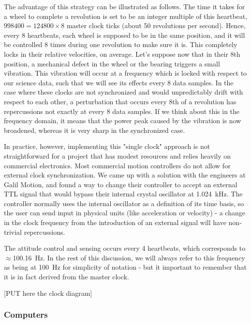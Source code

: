 The advantage of this strategy can be illustrated as follows. The time it takes for a wheel to complete a revolution is set to be an integer multiple of this heartbeat, $\num{998400}=\num{124800}\times 8$ master clock ticks (about 50 revolutions per second). Hence, every 8 heartbeats, each wheel is supposed to be in the same position, and it will be controlled 8 times during one revolution to make sure it is. This completely locks in their relative velocities, on average. Let's suppose now that in their 8th position, a mechanical defect in the wheel or the bearing triggers a small vibration. This vibration will occur at a frequency which is locked with respect to our science data, such that we will see its effects every 8 data samples. In the case where these clocks are not synchronized and would unpredictably drift with respect to each other, a perturbation that occurs every 8th of a revolution has repercussions not exactly at every 8 data samples. If we think about this in the frequency domain, it means that the power peak caused by the vibration is now broadened, whereas it is very sharp in the synchronized case.

In practice, however, implementing this "single clock" approach is not straightforward for a project that has modest resources and relies heavily on commercial electronics. Most commercial motion controllers do not allow for external clock synchronization. We came up with a solution with the engineers at Galil Motion, and found a way to change their controller to accept an external TTL signal that would bypass their internal crystal oscillator at \SI{1.024}{\kilo\hertz}. The controller normally uses the internal oscillator as a definition of its time basis, so the user can send input in physical units (like acceleration or velocity) - a change in the clock frequency from the introduction of an external signal will have non-trivial repercussions.

The attitude control and sensing occurs every 4 heartbeats, which corresponds to $\approx$\SI{100.16}{\hertz}. In the rest of this discussion, we will always refer to this frequency as being at \SI{100}{\hertz} for simplicity of notation - but it important to remember that it is in fact derived from the master clock.

[PUT here the clock diagram]

\subsubsection{Computers}

